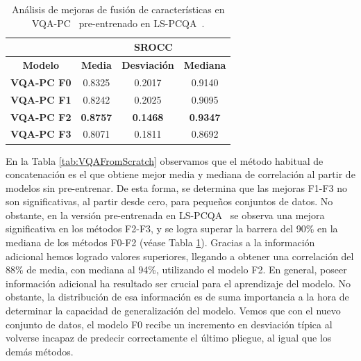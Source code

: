\begin{table}[htp]
  \scriptsize 
  \centering
\begin{tabular}{|c|c|c|c|}
\hline
\rowcolor[HTML]{FFC702}
                       & \multicolumn{3}{c|}{\textbf{SROCC}}                                                                                                          \\ \hline
\rowcolor[HTML]{FFC702}
\textbf{Modelo}    & \textbf{Media} & \textbf{Desviación} & \textbf{Mediana} \\ \hline
\textbf{VQA-PC F0} & 0.8325           & 0.2017              & 0.9140           \\ \hline
\textbf{VQA-PC F1} & 0.8242           & 0.2025              & 0.9095           \\ \hline
\textbf{VQA-PC F2} & \textbf{0.8757}  & \textbf{0.1468}     & \textbf{0.9347}  \\ \hline
\textbf{VQA-PC F3} & 0.8071           & 0.1811              & 0.8692           \\ \hline
\end{tabular}
\caption[Análisis de mejoras de fusión de características en VQA-PC pre-entrenado.]{
  Análisis de mejoras de fusión de características en VQA-PC~\cite{VQA-PC} pre-entrenado en LS-PCQA~\cite{ResSCNN}.
}\label{tab:VQAFromLSPCQA}
\end{table}

En la Tabla \ref{tab:VQAFromScratch} observamos que el método habitual de concatenación 
es el que obtiene mejor media y mediana de correlación al partir de modelos 
sin pre-entrenar. De esta forma, se determina que las mejoras F1-F3 no son 
significativas, al partir desde cero, para pequeños conjuntos de datos. 
No obstante, en la versión pre-entrenada en LS-PCQA~\cite{ResSCNN} se observa una mejora significativa en los métodos F2-F3, y se logra 
superar la barrera del 90\% en la mediana de los métodos F0-F2 (véase Tabla \ref{tab:VQAFromLSPCQA}).
Gracias a la información adicional hemos logrado valores superiores, llegando a 
obtener una correlación del 88\% de media, con mediana al 94\%, utilizando el modelo F2. 
En general, poseer información adicional ha resultado ser crucial para el aprendizaje 
del modelo. No obstante, la distribución de esa información es de suma importancia a la 
hora de determinar la capacidad de generalización del modelo. Vemos que con el nuevo 
conjunto de datos, el modelo F0 recibe un incremento en desviación típica al
volverse incapaz de predecir correctamente el último pliegue, al igual que los demás métodos.  


